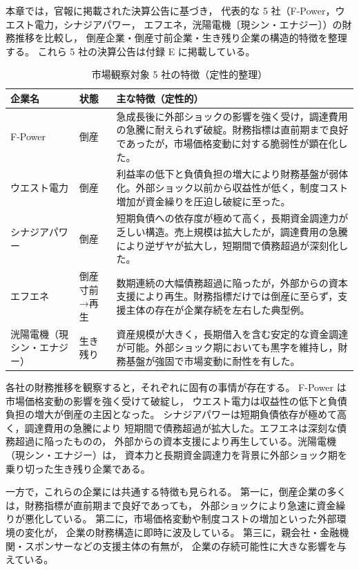 本章では，官報に掲載された決算公告に基づき，
代表的な 5 社（F-Power，ウエスト電力，シナジアパワー，
エフエネ，洸陽電機〔現シン・エナジー〕）の財務推移を比較し，
倒産企業・倒産寸前企業・生き残り企業の構造的特徴を整理する。
これら 5 社の決算公告は付録 E に掲載している。

\begin{table}[H]
\centering
\caption{市場観察対象 5 社の特徴（定性的整理）}
\begin{tabular}{p{3cm}p{2cm}p{8cm}}
\toprule
企業名 & 状態 & 主な特徴（定性的） \\
\midrule
F-Power & 倒産 &
急成長後に外部ショックの影響を強く受け，調達費用の急騰に耐えられず破綻。財務指標は直前期まで良好であったが，市場価格変動に対する脆弱性が顕在化した。 \\

ウエスト電力 & 倒産 &
利益率の低下と負債負担の増大により財務基盤が弱体化。外部ショック以前から収益性が低く，制度コスト増加が資金繰りを圧迫し破綻に至った。 \\

シナジアパワー & 倒産 &
短期負債への依存度が極めて高く，長期資金調達力が乏しい構造。売上規模は拡大したが，調達費用の急騰により逆ザヤが拡大し，短期間で債務超過が深刻化した。 \\

エフエネ & 倒産寸前→再生 &
数期連続の大幅債務超過に陥ったが，外部からの資本支援により再生。財務指標だけでは倒産に至らず，支援主体の存在が企業存続を左右した典型例。 \\

洸陽電機（現シン・エナジー） & 生き残り &
資産規模が大きく，長期借入を含む安定的な資金調達が可能。外部ショック期においても黒字を維持し，財務基盤が強固で市場変動に耐性を有した。 \\
\bottomrule
\end{tabular}
\end{table}

各社の財務推移を観察すると，それぞれに固有の事情が存在する。
F-Power は市場価格変動の影響を強く受けて破綻し，
ウエスト電力は収益性の低下と負債負担の増大が倒産の主因となった。
シナジアパワーは短期負債依存が極めて高く，調達費用の急騰により
短期間で債務超過が拡大した。エフエネは深刻な債務超過に陥ったものの，
外部からの資本支援により再生している。洸陽電機（現シン・エナジー）は，
資本力と長期資金調達力を背景に外部ショック期を乗り切った生き残り企業である。

一方で，これらの企業には共通する特徴も見られる。
第一に，倒産企業の多くは，財務指標が直前期まで良好であっても，
外部ショックにより急速に資金繰りが悪化している。
第二に，市場価格変動や制度コストの増加といった外部環境の変化が，
企業の財務構造に即時に波及している。
第三に，親会社・金融機関・スポンサーなどの支援主体の有無が，
企業の存続可能性に大きな影響を与えている。

